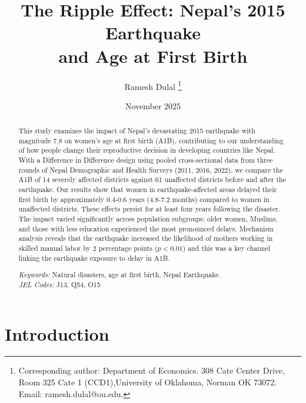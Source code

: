 \documentclass[11pt,a4paper]{article}
\begin{document}
\title{The Ripple Effect: Nepal's 2015 Earthquake \\ and Age at First Birth
}
  \author{Ramesh Dulal \thanks{Corresponding author: Department of Economics. 308 Cate Center Drive, Room 325 Cate 1 (CCD1),University of Oklahoma, Norman OK 73072. Email: ramesh.dulal@ou.edu.} %
        }
        
\date{November 2025}
\maketitle
\begin{abstract}

\noindent This study examines the impact of Nepal's devastating 2015 earthquake with magnitude 7.8 on women's age at first birth (A1B), contributing to our understanding of how people change their reproductive decision in developing countries like Nepal. With a Difference in Difference design using pooled cross-sectional data from three rounds of Nepal Demographic and Health Surveys (2011, 2016, 2022), we compare the A1B of 14 severely affected districts against 61 unaffected districts before and after the earthquake. Our results show that women in earthquake-affected areas delayed their first birth by approximately 0.4-0.6 years (4.8-7.2 months) compared to women in unaffected districts. These effects persist for at least four years following the disaster. The impact varied significantly across population subgroups: older women, Muslims, and those with less education experienced the most pronounced delays. Mechanism analysis reveals that the earthquake increased the likelihood of mothers working in skilled manual labor by 2 percentage points ($p<0.01$) and this was a key channel linking the earthquake exposure to delay in A1B. 


\vspace{0.75 cm}
	\noindent \emph{Keywords:} Natural disasters, age at first birth, Nepal Earthquake.\vspace{0.25 cm} \\
	\noindent \emph{JEL Codes:} J13, Q54, O15
	
\end{abstract}

\newpage
\noindent \section{Introduction}
\end{document}
